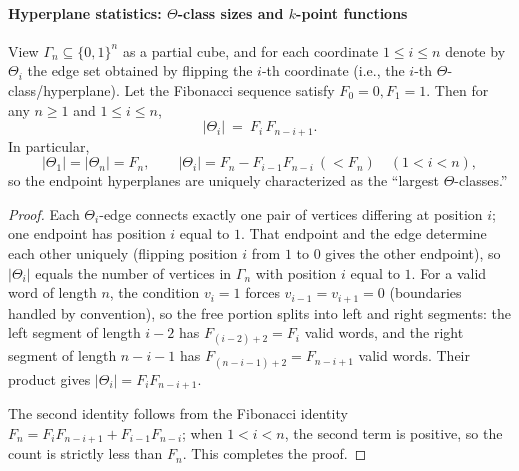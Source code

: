 \paragraph{Hyperplane statistics: \(\Theta\)-class sizes and \(k\)-point functions}

\begin{theorem}\label{thm:pom-fibcube-theta-class-size}
View \(\Gamma_n\subseteq\{0,1\}^n\) as a partial cube, and for each coordinate \(1\le i\le n\) denote by \(\Theta_i\) the edge set obtained by flipping the \(i\)-th coordinate (i.e., the \(i\)-th \(\Theta\)-class/hyperplane).
Let the Fibonacci sequence satisfy \(F_0=0,F_1=1\).
Then for any \(n\ge 1\) and \(1\le i\le n\),
\[
|\Theta_i|\ =\ F_i\,F_{n-i+1}.
\]
In particular,
\[
|\Theta_1|=|\Theta_n|=F_n,\qquad
|\Theta_i|=F_n-F_{i-1}F_{n-i}\ (<F_n)\quad(1<i<n),
\]
so the endpoint hyperplanes are uniquely characterized as the ``largest \(\Theta\)-classes.''
\end{theorem}
\begin{proof}
Each \(\Theta_i\)-edge connects exactly one pair of vertices differing at position \(i\); one endpoint has position \(i\) equal to \(1\).
That endpoint and the edge determine each other uniquely (flipping position \(i\) from \(1\) to \(0\) gives the other endpoint),
so \(|\Theta_i|\) equals the number of vertices in \(\Gamma_n\) with position \(i\) equal to \(1\).
For a valid word of length \(n\), the condition \(v_i=1\) forces \(v_{i-1}=v_{i+1}=0\) (boundaries handled by convention),
so the free portion splits into left and right segments: the left segment of length \(i-2\) has \(F_{(i-2)+2}=F_i\) valid words, and the right segment of length \(n-i-1\) has \(F_{(n-i-1)+2}=F_{n-i+1}\) valid words.
Their product gives \(|\Theta_i|=F_iF_{n-i+1}\).
\par
The second identity follows from the Fibonacci identity \(F_n=F_iF_{n-i+1}+F_{i-1}F_{n-i}\); when \(1<i<n\), the second term is positive, so the count is strictly less than \(F_n\).
This completes the proof.
\end{proof}

